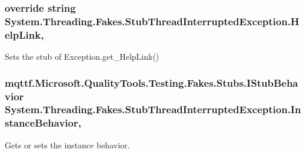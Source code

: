 \hypertarget{class_system_1_1_threading_1_1_fakes_1_1_stub_thread_interrupted_exception_ae664fb6a2d2a5507200176750b4f2cc1}{
\subsubsection[{Help\-Link}]{\setlength{\rightskip}{0pt plus 5cm}override string System.\-Threading.\-Fakes.\-Stub\-Thread\-Interrupted\-Exception.\-Help\-Link\hspace{0.3cm}{\ttfamily [get]}, {\ttfamily [set]}}}\label{class_system_1_1_threading_1_1_fakes_1_1_stub_thread_interrupted_exception_ae664fb6a2d2a5507200176750b4f2cc1}


Sets the stub of Exception.\-get\-\_\-\-Help\-Link()

\hypertarget{class_system_1_1_threading_1_1_fakes_1_1_stub_thread_interrupted_exception_a210d6141b22b9ebba983eab38db0443a}{
\subsubsection[{Instance\-Behavior}]{\setlength{\rightskip}{0pt plus 5cm}mqttf.\-Microsoft.\-Quality\-Tools.\-Testing.\-Fakes.\-Stubs.\-I\-Stub\-Behavior System.\-Threading.\-Fakes.\-Stub\-Thread\-Interrupted\-Exception.\-Instance\-Behavior\hspace{0.3cm}{\ttfamily [get]}, {\ttfamily [set]}}}\label{class_system_1_1_threading_1_1_fakes_1_1_stub_thread_interrupted_exception_a210d6141b22b9ebba983eab38db0443a}


Gets or sets the instance behavior.

